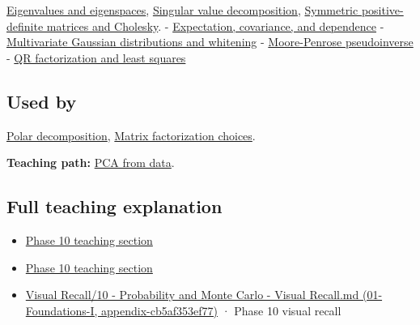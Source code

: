 \hyperref[appendix-0b3be18411f9]{Eigenvalues and eigenspaces}, \hyperref[appendix-1fad5e7f36fa]{Singular value decomposition}, \hyperref[appendix-50d2ea3c9b26]{Symmetric positive-definite matrices and Cholesky}. - \hyperref[appendix-54c383df9992]{Expectation, covariance, and dependence} - \hyperref[appendix-12bbe185dbe5]{Multivariate Gaussian distributions and whitening} - \hyperref[appendix-541306fdbc1b]{Moore-Penrose pseudoinverse} - \hyperref[appendix-c3421e6b4f2c]{QR factorization and least squares}

\subsection{Used by}\label{used-by}

\hyperref[appendix-73f5bcf7a462]{Polar decomposition}, \hyperref[appendix-221a483bec2d]{Matrix factorization choices}.

\textbf{Teaching path:} \href{Continuous\%20Notes/Computing\%20Foundations\%20-\%20From\%20Bits\%20to\%20C++\%20and\%20Systems\%20APIs\#PCA\%20turns\%20a\%20cloud\%20of\%20points\%20into\%20measured\%20variation}{PCA from data}.

\subsection{Full teaching explanation}\label{full-teaching-explanation}

\begin{itemize}
\tightlist
\item
  \href{Continuous\%20Notes/Computing\%20Foundations\%20-\%20From\%20Bits\%20to\%20C++\%20and\%20Systems\%20APIs\#3.\%20Expected\%20values\%20describe\%20centers;\%20covariance\%20describes\%20dependence}{Phase 10 teaching section}
\item
  \href{Continuous\%20Notes/Computing\%20Foundations\%20-\%20From\%20Bits\%20to\%20C++\%20and\%20Systems\%20APIs\#5.\%20Waiting\%20times,\%20event\%20counts,\%20and\%20covariance\%20geometry}{Phase 10 teaching section}
\item
  \href{}{Visual Recall/10 - Probability and Monte Carlo - Visual Recall.md (01-Foundations-I, appendix-cb5af353ef77)} · Phase 10 visual recall
\end{itemize}
